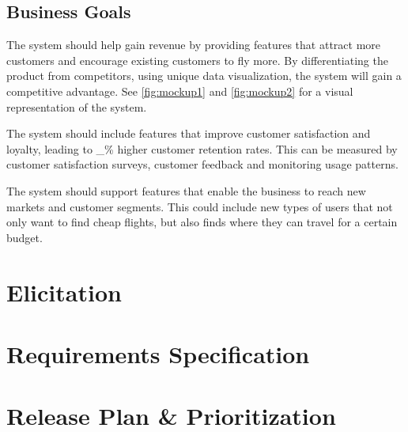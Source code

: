 \documentclass[a4paper]{article}
\begin{document}
\subsection{Business Goals}
The system should help gain revenue by providing features that attract more customers and encourage existing customers to fly more. By differentiating the product from competitors, using unique data visualization, the system will gain a competitive advantage.
See \autoref{fig:mockup1} and \autoref{fig:mockup2} for a visual representation of the system.

The system should include features that improve customer satisfaction and loyalty, leading to _\% higher customer retention rates. This can be measured by customer satisfaction surveys, customer feedback and monitoring usage patterns.

The system should support features that enable the business to reach new markets and customer segments. This could include new types of users that not only want to find cheap flights, but also finds where they can travel for a certain budget.


\section{Elicitation}


\newpage
\section{Requirements Specification}



\section{Release Plan \& Prioritization}


\end{document}

